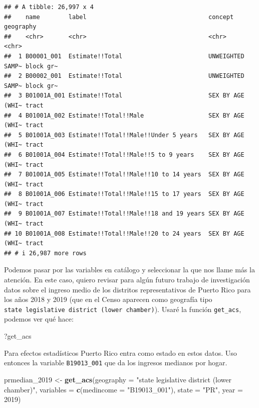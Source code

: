 \documentclass[
]{article}
\newenvironment{Shaded}{\begin{snugshade}}{\end{snugshade}}
\newcommand{\AttributeTok}[1]{\textcolor[rgb]{0.13,0.29,0.53}{#1}}
\newcommand{\DecValTok}[1]{\textcolor[rgb]{0.00,0.00,0.81}{#1}}
\newcommand{\FunctionTok}[1]{\textcolor[rgb]{0.13,0.29,0.53}{\textbf{#1}}}
\newcommand{\NormalTok}[1]{#1}
\newcommand{\OtherTok}[1]{\textcolor[rgb]{0.56,0.35,0.01}{#1}}
\newcommand{\StringTok}[1]{\textcolor[rgb]{0.31,0.60,0.02}{#1}}
\begin{document}
\begin{verbatim}
## # A tibble: 26,997 x 4
##    name        label                                  concept          geography
##    <chr>       <chr>                                  <chr>            <chr>    
##  1 B00001_001  Estimate!!Total                        UNWEIGHTED SAMP~ block gr~
##  2 B00002_001  Estimate!!Total                        UNWEIGHTED SAMP~ block gr~
##  3 B01001A_001 Estimate!!Total                        SEX BY AGE (WHI~ tract    
##  4 B01001A_002 Estimate!!Total!!Male                  SEX BY AGE (WHI~ tract    
##  5 B01001A_003 Estimate!!Total!!Male!!Under 5 years   SEX BY AGE (WHI~ tract    
##  6 B01001A_004 Estimate!!Total!!Male!!5 to 9 years    SEX BY AGE (WHI~ tract    
##  7 B01001A_005 Estimate!!Total!!Male!!10 to 14 years  SEX BY AGE (WHI~ tract    
##  8 B01001A_006 Estimate!!Total!!Male!!15 to 17 years  SEX BY AGE (WHI~ tract    
##  9 B01001A_007 Estimate!!Total!!Male!!18 and 19 years SEX BY AGE (WHI~ tract    
## 10 B01001A_008 Estimate!!Total!!Male!!20 to 24 years  SEX BY AGE (WHI~ tract    
## # i 26,987 more rows
\end{verbatim}

Podemos pasar por las variables en catálogo y seleccionar la que nos
llame más la atención. En este caso, quiero revisar para algún futuro
trabajo de investigación datos sobre el ingreso medio de los distritos
representativos de Puerto Rico para los años 2018 y 2019 (que en el
Censo aparecen como geografía tipo
\texttt{state\ legislative\ district\ (lower\ chamber)}). Usaré la
función \texttt{get\_acs}, podemos ver qué hace:

\begin{Shaded}
\begin{Highlighting}[]
\NormalTok{?get\_acs}
\end{Highlighting}
\end{Shaded}

Para efectos estadísticos Puerto Rico entra como estado en estos datos.
Uso entonces la variable \texttt{B19013\_001} que da los ingresos
medianos por hogar.

\begin{Shaded}
\begin{Highlighting}[]
\NormalTok{prmedian\_2019 }\OtherTok{\textless{}{-}} \FunctionTok{get\_acs}\NormalTok{(}\AttributeTok{geography =} \StringTok{"state legislative district (lower chamber)"}\NormalTok{, }
              \AttributeTok{variables =} \FunctionTok{c}\NormalTok{(}\AttributeTok{medincome =} \StringTok{"B19013\_001"}\NormalTok{), }
              \AttributeTok{state =} \StringTok{"PR"}\NormalTok{, }
              \AttributeTok{year =} \DecValTok{2019}\NormalTok{)}
\end{Highlighting}
\end{Shaded}
\end{document}
